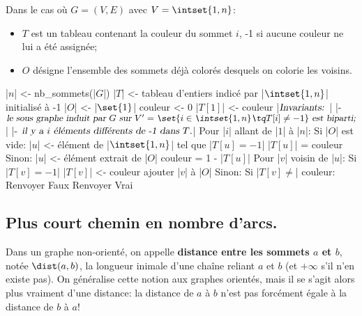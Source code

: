\documentclass{scrartcl}
\begin{document}
			Dans le cas où $G=(V,E)$ avec $V = \intset{1,n}$:
			\begin{itemize}
				\item $T$ est un tableau contenant la couleur du sommet $i$, -1 si aucune couleur ne lui a été assignée;
				\item $O$ désigne l'ensemble des sommets déjà colorés desquels on colorie les voisins.
			\end{itemize}
			\begin{algotext}
				|$n$| <- nb_sommets(|$G$|)
				|$T$| <- tableau d'entiers indicé par |$\intset{1,n}$| initialisé à -1
				|$O$| <- |$\set{1}$|
				couleur <- 0
				|$T[1]$| <- couleur
				|$\textsl{Invariants: }$|
					|- $ \textsl{le sous graphe induit par $G$ sur $V' = \set{i \in \intset{1,n} \tq T[i] \neq -1}$ est biparti;}$|
					|- $ \textsl{il y a $i$ éléments différents de -1 dans $T$.}$|
				Pour |$i$| allant de |$1$| à |$n$|:
					Si |$O$| est vide:
						|$u$| <- élément de |$\intset{1,n}$| tel que |$T[u] = -1$|
						|$T[u]$| = couleur
					Sinon:
						|$u$| <- élément extrait de |$O$|
					couleur = 1 - |$T[u]$|
					Pour |$v$| voisin de |$u$|:
						Si |$T[v] = -1$|
							|$T[v]$| <- couleur
							ajouter |$v$| à |$O$|
						Sinon:
							Si |$T[v] \neq$| couleur:
								Renvoyer Faux
				Renvoyer Vrai
			\end{algotext}

		\subsection{Plus court chemin en nombre d'arcs.}
			 Dans un graphe non-orienté, on appelle \textbf{distance entre les sommets $a$ et $b$}, notée $\dist(a,b)$,
			la longueur inimale d'une chaîne reliant $a$ et $b$ (et $+\infty$ s'il n'en existe pas).
			On généralise cette notion aux graphes orientés, mais il se s'agit alors plus vraiment d'une distance: 
			la distance de $a$ à $b$ n'est pas forcément égale à la distance de $b$ à $a$! 
\end{document}
